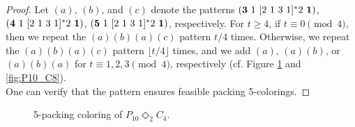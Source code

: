 \documentclass{article}
\begin{document}
\begin{proof}
\noindent Let $(a)$, $(b)$, and $(c)$ denote the patterns $({\bf 3}\ 1\ [2\ 1\ 3\ 1]^*2\ {\bf 1})$, $({\bf 4}\ 1\ [2\ 1\ 3\ 1]^* 2\ {\bf 1})$, $({\bf 5}\ 1\ [2\ 1\ 3\ 1]^*2\ {\bf 1})$, respectively. For $t \geq 4$, if $t \equiv 0 \pmod{4}$, then we repeat the $(a)(b)(a)(c)$ pattern $t/4$ times. Otherwise, we repeat the $(a)(b)(a)(c)$ pattern $\lfloor t/4\rfloor$ times, and we add $(a)$, $(a)(b)$, or $(a)(b)(a)$ for $t\equiv 1, 2, 3 \pmod{4}$, respectively (cf. Figure \ref{fig:P10_C4} and \ref{fig:P10_C8}).
\\One can verify that the pattern ensures feasible packing 5-colorings.
\end{proof}

\begin{figure}[H]
\centering
{}
\caption{5-packing coloring of $P_{10} \mathbin{\Diamond_2} C_4$.}\label{fig:P10_C4}
\end{figure}
\end{document}
